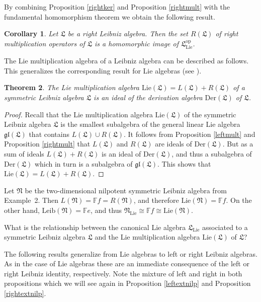 \documentclass{amsart}
\newtheorem{thm}{Theorem}[section]
\newtheorem{cor}[thm]{Corollary}
\numberwithin{equation}{section}
\newcommand{\op}{\mathrm{op}}
\newcommand{\der}{\mathrm{Der}}
\newcommand{\lie}{\mathrm{Lie}}
\newcommand{\leib}{\mathrm{Leib}}
\newcommand{\F}{\mathbb{F}}
\newcommand{\lf}{\mathfrak{L}}
\newcommand{\nf}{\mathfrak{N}}
\newcommand{\gl}{\mathfrak{gl}}
\begin{document}
By combining Proposition \ref{rightker} and Proposition \ref{rightmult} with the fundamental
homomorphism theorem we obtain the following result.

\begin{cor}\label{rightleiblie}
Let $\lf$ be a right Leibniz algebra. Then the set $R(\lf)$ of right multiplication operators of $\lf$ is
a homomorphic image of $\lf_\lie^\op$.
\end{cor}

The Lie multiplication algebra of a Leibniz algebra can be described as follows. This generalizes
the corresponding result for Lie algebras (see \cite[p. 21]{S}).

\begin{thm}\label{liemult}
The Lie multiplication algebra $\lie(\lf)=L(\lf)+R(\lf)$ of a symmetric Leibniz algebra $\lf$ is an ideal
of the derivation algebra $\der(\lf)$ of $\lf$.
\end{thm}

\begin{proof}
Recall that the Lie multiplication algebra $\lie(\lf)$ of the symmetric Leibniz algebra $\lf$ is the
smallest subalgebra of the general linear Lie algebra $\gl(\lf)$ that contains $L(\lf)\cup R(\lf)$.
It follows from Proposition \ref{leftmult} and Proposition \ref{rightmult} that $L(\lf)$ and $R(\lf)$
are ideals of $\der(\lf)$. But as a sum of ideals $L(\lf)+R(\lf)$ is an ideal of $\der(\lf)$, and
thus a subalgebra of $\der(\lf)$ which in turn is a subalgebra of $\gl(\lf)$. This shows that
$\lie(\lf)=L(\lf)+R(\lf)$.
\end{proof}

 Let $\nf$ be the two-dimensional nilpotent symmetric Leibniz algebra
from Example~2. Then $L(\nf)=\F f=R(\nf)$, and therefore $\lie(\nf)=\F f$. On the other hand,
$\leib(\nf)=\F e$, and thus $\nf_\lie\cong\F f\cong\lie(\nf)$.
\vspace{.3cm}

 What is the relationship between the canonical Lie algebra $\lf_\lie$
associated to a symmetric Leibniz algebra $\lf$ and the Lie multiplication algebra $\lie(\lf)$ of
$\lf$?
\vspace{.3cm}

The following results generalize \cite[Exercise I.1.6]{Bou} from Lie algebras to left or right Leibniz
algebras. As in the case of Lie algebras these are an immediate consequence of the left or right
Leibniz identity, respectively. Note the mixture of left and right in both propositions which we will
see again in Proposition \ref{leftextnilp} and Proposition \ref{rightextnilp}.
\end{document}
